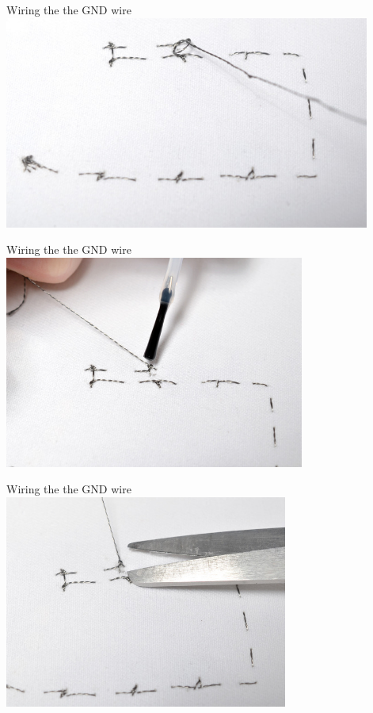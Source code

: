 \documentclass[aspectratio=169]{beamer}
\begin{document}
\begin{frame}[fragile]{Wiring the the GND wire}
\includegraphics[height=2.75in]{flora_DSC_0121.jpg}
\end{frame}
\begin{frame}[fragile]{Wiring the the GND wire}
\includegraphics[height=2.75in]{flora_DSC_0123.jpg}
\end{frame}
\begin{frame}[fragile]{Wiring the the GND wire}
\includegraphics[height=2.75in]{flora_DSC_0125.jpg}
\end{frame}
\end{document}
